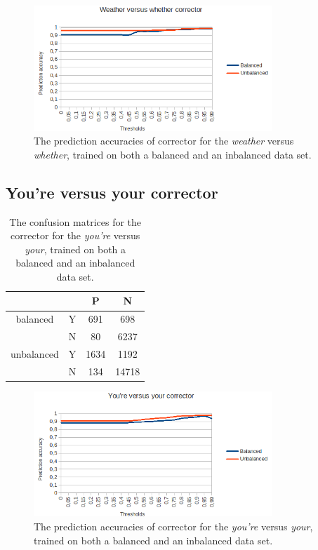 \documentclass[12pt]{article}
\begin{document}
\begin{figure}[H]
\centering
\includegraphics[width=0.8\textwidth]{accuracy_weatherwhether.png}
\caption{The prediction accuracies of corrector for the \emph{weather} versus \emph{whether}, trained on both a balanced and an inbalanced data set.}
\end{figure}

\subsection{You're versus your corrector}

\begin{table}[H] \footnotesize
\centering
\begin{tabular}{|c|c|c|c|}
\hline
&&P&N\\
\hline
balanced&Y&691&698\\
&N&80&6237\\
\hline
\hline
unbalanced&Y&1634&1192\\
&N&134&14718\\
\hline
\end{tabular}
\caption{The confusion matrices for the corrector for the \emph{you're} versus \emph{your}, trained on both a balanced and an inbalanced data set.}
\end{table}

\begin{figure}[H]
\centering
\includegraphics[width=0.8\textwidth]{accuracy_you'reyour.png}
\caption{The prediction accuracies of corrector for the \emph{you're} versus \emph{your}, trained on both a balanced and an inbalanced data set.}
\end{figure}
\end{document}
